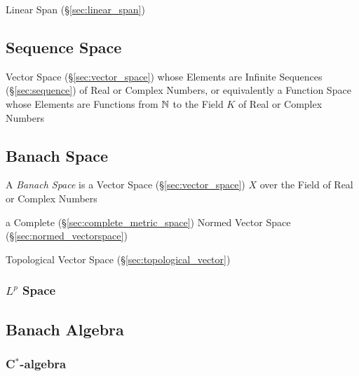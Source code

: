 Linear Span (\S\ref{sec:linear_span})



\subsection{Sequence Space}\label{sec:sequence_space}

Vector Space (\S\ref{sec:vector_space}) whose Elements are Infinite Sequences
(\S\ref{sec:sequence}) of Real or Complex Numbers, or equivalently a Function
Space whose Elements are Functions from $\mathbb{N}$ to the Field $K$ of Real or
Complex Numbers



\subsection{Banach Space}\label{sec:banach_space}

A \emph{Banach Space} is a Vector Space (\S\ref{sec:vector_space}) $X$ over the
Field of Real or Complex Numbers

a Complete (\S\ref{sec:complete_metric_space}) Normed Vector Space
(\S\ref{sec:normed_vectorspace})

Topological Vector Space (\S\ref{sec:topological_vector})



\subsubsection{$L^p$ Space}\label{sec:lp_space}



\subsection{Banach Algebra}\label{sec:banach_algebra}

\subsubsection{C$^*$-algebra}\label{sec:cstar_algebra}

